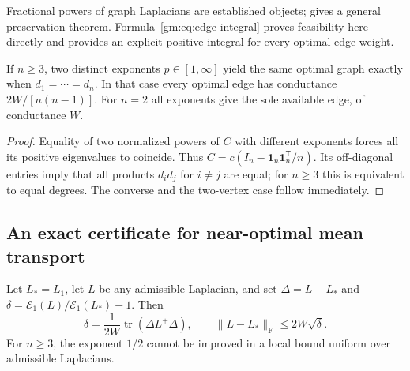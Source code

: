Fractional powers of graph Laplacians are established objects;
\cite[Theorem~3.1]{benzi2022} gives a general preservation theorem.
Formula~\eqref{gm:eq:edge-integral} proves feasibility here directly and
provides an explicit positive integral for every optimal edge weight.

\begin{corollary}\label{gm:cor:different}
If $n\ge3$, two distinct exponents $p\in[1,\infty]$ yield the same optimal
graph exactly when $d_1=\cdots=d_n$. In that case every optimal edge has
conductance $2W/[n(n-1)]$. For $n=2$ all exponents give the sole available
edge, of conductance $W$.
\end{corollary}

\begin{proof}
Equality of two normalized powers of $C$ with different exponents forces all
its positive eigenvalues to coincide. Thus $C=c(I_n-\mathbf1_n\mathbf1_n^{\mathsf T}/n)$.
Its off-diagonal entries imply that all products $d_id_j$ for $i\ne j$ are
equal; for $n\ge3$ this is equivalent to equal degrees. The converse and the
two-vertex case follow immediately.
\end{proof}

\subsection{An exact certificate for near-optimal mean transport}

\begin{proposition}\label{gm:prop:stability}
Let $L_*=L_1$, let $L$ be any admissible Laplacian, and set
$\Delta=L-L_*$ and $\delta=\mathcal E_1(L)/\mathcal E_1(L_*)-1$.
Then
\begin{equation}\label{gm:eq:gap}
 \delta=\frac1{2W}\operatorname{tr}(\Delta L^+\Delta),\qquad
 \|L-L_*\|_{\mathrm F}\le2W\sqrt\delta.
\end{equation}
For $n\ge3$, the exponent $1/2$ cannot be improved in a local bound uniform
over admissible Laplacians.
\end{proposition}


